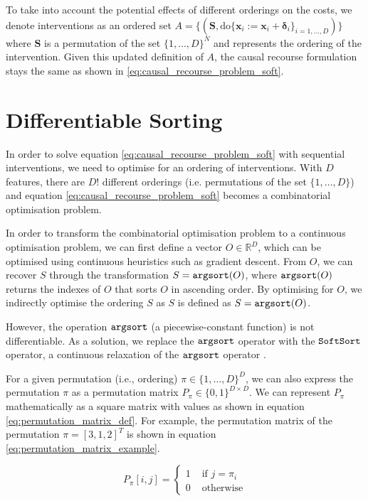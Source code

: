 To take into account the potential effects of different orderings on the costs, we denote interventions as an ordered set $A = \big\{(\mathbf{S}, \text{do} \{\mathbf{x}_i:=\mathbf{x}_i + \boldsymbol{\delta}_i\}_{i=1, \ldots, D})\big\}$ where $\mathbf{S}$ is a permutation of the set $\{1, \ldots, D\}^N$ and represents the ordering of the intervention. Given this updated definition of $A$, the causal recourse formulation stays the same as shown in \ref{eq:causal_recourse_problem_soft}.

\section{Differentiable Sorting}

In order to solve equation \ref{eq:causal_recourse_problem_soft} with sequential interventions, we need to optimise for an ordering of interventions. With $D$ features, there are $D!$ different orderings (i.e. permutations of the set $\{1, \ldots, D\}$) and equation \ref{eq:causal_recourse_problem_soft} becomes a combinatorial optimisation problem.

In order to transform the combinatorial optimisation problem to a continuous optimisation problem, we can first define a vector $O\in \mathbb{R}^{D}$, which can be optimised using continuous heuristics such as gradient descent. From $O$, we can recover $S$ through the transformation $S = \operatorname*{\texttt{argsort}}(O)$, where $\operatorname*{\texttt{argsort}}(O)$ returns the indexes of $O$ that sorts $O$ in ascending order. By optimising for $O$, we indirectly optimise the ordering $S$ as $S$ is defined as $S = \operatorname*{\texttt{argsort}}(O)$.

However, the operation $\operatorname*{\texttt{argsort}}$ (a piecewise-constant function) is not differentiable. As a solution, we replace the $\operatorname*{\texttt{argsort}}$ operator with the $\operatorname*{\texttt{SoftSort}}$ operator, a continuous relaxation of the $\operatorname*{\texttt{argsort}}$ operator \citep{prilloSoftSortContinuousRelaxation2020}.

For a given permutation (i.e., ordering) $\pi \in \{1, \ldots, D\}^D$, we can also express the permutation $\pi$ as a permutation matrix $P_{\pi} \in \{0,1\}^{D \times D}$. We can represent $P_{\pi}$ mathematically as a square matrix with values as shown in equation \ref{eq:permutation_matrix_def}. For example, the permutation matrix of the permutation $\pi = [3, 1, 2]^T$ is shown in equation \ref{eq:permutation_matrix_example}. 

\begin{equation} \label{eq:permutation_matrix_def}
	P_{\pi}[i,j] = \begin{cases}
		1 & \text{ if } j = \pi_i \\
		0 & \text{ otherwise}
	\end{cases}
\end{equation}

